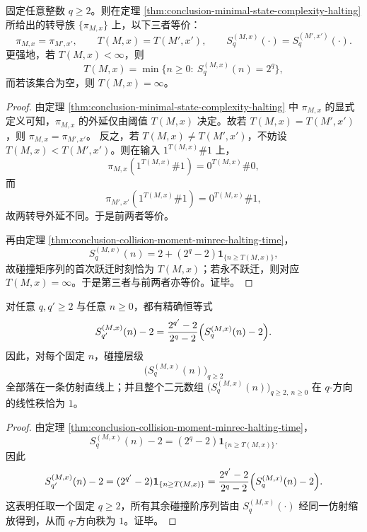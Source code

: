 \begin{theorem}[单一碰撞阶在该显式族上的完备分类性]\label{thm:conclusion-single-q-collision-complete-classification}
固定任意整数 \(q\ge 2\)。则在定理 \ref{thm:conclusion-minimal-state-complexity-halting} 所给出的转导族 \(\{\pi_{M,x}\}\) 上，以下三者等价：
\[
\pi_{M,x}=\pi_{M',x'},
\qquad
T(M,x)=T(M',x'),
\qquad
S_q^{(M,x)}(\cdot)=S_q^{(M',x')}(\cdot).
\]
更强地，若 \(T(M,x)<\infty\)，则
\[
T(M,x)=\min\bigl\{n\ge 0:\ S_q^{(M,x)}(n)=2^q\bigr\},
\]
而若该集合为空，则 \(T(M,x)=\infty\)。
\end{theorem}
\begin{proof}
由定理 \ref{thm:conclusion-minimal-state-complexity-halting} 中 \(\pi_{M,x}\) 的显式定义可知，\(\pi_{M,x}\) 的外延仅由阈值 \(T(M,x)\) 决定。故若 \(T(M,x)=T(M',x')\)，则 \(\pi_{M,x}=\pi_{M',x'}\)。
反之，若 \(T(M,x)\neq T(M',x')\)，不妨设 \(T(M,x)<T(M',x')\)。则在输入 \(1^{T(M,x)}\#1\) 上，
\[
\pi_{M,x}(1^{T(M,x)}\#1)=0^{T(M,x)}\#0,
\]
而
\[
\pi_{M',x'}(1^{T(M,x)}\#1)=0^{T(M,x)}\#1,
\]
故两转导外延不同。于是前两者等价。

再由定理 \ref{thm:conclusion-collision-moment-minrec-halting-time}，
\[
S_q^{(M,x)}(n)=2+(2^q-2)\mathbf 1_{\{n\ge T(M,x)\}},
\]
故碰撞矩序列的首次跃迁时刻恰为 \(T(M,x)\)；若永不跃迁，则对应 \(T(M,x)=\infty\)。于是第三者与前两者亦等价。证毕。
\end{proof}

\begin{proposition}[全阶碰撞层级在碰撞阶方向上的仿射秩一塌缩]\label{prop:conclusion-collision-hierarchy-affine-rank-one}
对任意 \(q,q'\ge 2\) 与任意 \(n\ge 0\)，都有精确恒等式
\[
S_{q'}^{(M,x)}(n)-2
=
\frac{2^{q'}-2}{2^q-2}\Bigl(S_q^{(M,x)}(n)-2\Bigr).
\]
因此，对每个固定 \(n\)，碰撞层级
\[
\bigl(S_q^{(M,x)}(n)\bigr)_{q\ge 2}
\]
全部落在一条仿射直线上；并且整个二元数组 \(\bigl(S_q^{(M,x)}(n)\bigr)_{q\ge 2,\ n\ge 0}\) 在 \(q\)-方向的线性秩恰为 \(1\)。
\end{proposition}
\begin{proof}
由定理 \ref{thm:conclusion-collision-moment-minrec-halting-time}，
\[
S_q^{(M,x)}(n)-2=(2^q-2)\mathbf 1_{\{n\ge T(M,x)\}}.
\]
因此
\[
S_{q'}^{(M,x)}(n)-2
=(2^{q'}-2)\mathbf 1_{\{n\ge T(M,x)\}}
=\frac{2^{q'}-2}{2^q-2}\Bigl(S_q^{(M,x)}(n)-2\Bigr).
\]
这表明任取一个固定 \(q\ge 2\)，所有其余碰撞阶序列皆由 \(S_q^{(M,x)}(\cdot)\) 经同一仿射缩放得到，从而 \(q\)-方向秩为 \(1\)。证毕。
\end{proof}

